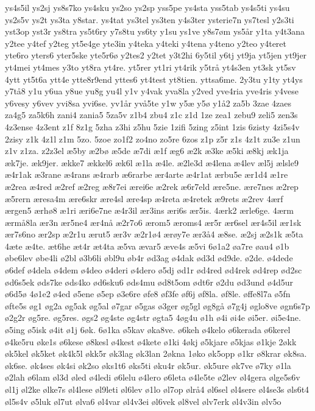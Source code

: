{ys4s5il
ys2sj
ys8s7ko
ys4sku
ys2so
ys2sp
yss5pe
ys4sta
yss5tab
ys4s5ti
ys4su
ys2s5v
ys2t
ys3ta
y8star.
ys4tat
ys3tel
ys3ten
y4s3ter
ysterie7n
ys7tesl
y2s3ti
yst3op
yst3r
ys8tra
ys5t6ry
y7s8tu
ys6ty
y1su
ys1ve
y8s7øm
ys5år
y1ta
y4t3ana
y2tee
y4tef
y2teg
yt5e4ge
yte3in
y4teka
y4teki
y4tena
y4teno
y2teo
y4teret
yte6ro
yters6
yter5ske
yte5r6ø
y2tes2
y2tet
y3t2hi
6y5til
y6tj
yt9ja
yt5jen
yt9jer
yt4mei
yt4mes
y3to
yt8ra
yt4re.
yt5rer
yt1ri
yt4rik
y5trå
yt4s3en
yt3sk
yt5sv
4ytt
yt5t6a
ytt4e
ytte8r9end
yttes6
yt4test
yt8tien.
yttsa6me.
2y3tu
y1ty
yt4ys
y7tå8
y1u
y6ua
y8ue
yu8g
yu4l
y1v
y4vak
yva8la
y2ved
yve4ria
yve4ris
y4vese
y6vesy
y6vev
yvi8sa
yvi6se.
yv1år
yvå5te
y1w
y5æ
y5ø
y1å2
za5b
3zae
4zaes
za4g5
za5k6h
zani4
zania5
5za5v
z1b4
zbu4
z1c
z1d
1ze
zea1
zebu9
zeli5
zen3s
4z3ense
4z3ent
z1f
8z1g
5zha
z3hi
z5hu
5zie
1zifi
5zing
z5int
1zis
6zisty
4zi5s4v
2zisy
z1k
4z1l
z1m
5zo.
5zoe
zo1f2
zo4no
zo5re
6zos
z1p
z5r
z1s
4z1t
zu3e
z1un
z1v
z1za.
z2z3el
æ5by
æ2bø
æ5de
æ7di
æ1f
æg6
æ2k
æ3ke
æ5ki
æ8kj
æk1ja
æk7je.
æk9jer.
ække7
ækkel6
æk6l
æ1la
æ4le.
æ2le3d
æ4lena
æ4lev
æl5j
ælsle9
æ4r1ak
æ3rane
æ4rans
æ4rarb
æ6rarbe
ær4arte
æ4r1at
ærbu5e
ær1d4
æ1re
æ2rea
æ4red
æ2ref
æ2reg
æ8r7ei
ærei6e
æ2rek
æ6r7eld
ære5ne.
ære7nes
æ2rep
æ5rern
æresa4m
ære6skr
ære4sl
ære4sp
æ4reta
æ4retek
æ9rets
æ2rev
4ærf
ærgen5
ærhø8
æ1ri
æri6e7ne
æ4r3il
ær3ins
æri6s
ær5is.
4ærk2
ærle6ge.
4ærm
ærmå8la
ær3n
ær5ne4
ær4nå
æ2r7o6
ærom5
æroms4
ær5r
ær6sel
ær4s5il
ær1sk
ær7s6no
ær2sp
æ2r1u
ærut5
ær3v
æ2r1ø4
ærøy7e
ær3å4
æ8se.
æ2sj
æ2s1k
æ5ta
4æte
æ4te.
æt6he
æt4r
æt4ta
æ5va
ævar5
æve4s
æ5vi
6ø1a2
øa7re
øau4
ø1b
øbe6lev
øbe4li
ø2bl
ø3b6li
øbl9u
øb4r
ød3ag
ø4dak
ød3d
ød9de.
ø2de.
ø4dede
ø6def
ø4dela
ø4dem
ø4deo
ø4deri
ø4dero
ø5dj
ød1r
ød4red
ød4rek
ød4rep
ød2sc
ød6s5ek
øds7ke
øds4ko
ød6sku6
øds4mu
ød8t5om
ødt6r
ø2du
ød3und
ø4d5ur
ø6d5ø
4ø1e2
ø4ed
ø5ene
ø5ep
ø3e6re
øfe8
øf3fe
øf6j
øf8la.
øf8le.
øffe8l7a
ø5fn
øfte5s
øg1
øg2a
øg5ak
øg5al
ø7gar
ø5gas
ø3ger
øg5gl
øg8gå
ø7g4j
øglo8ve
øgn6s7p
ø2g2r
øg5re.
øg5res.
øgs2
øg4ste
øg4str
øgta5
4øg4u
ø1h
ø4i
øi4e
øi5er.
øi5e4ne.
ø5ing
ø5isk
ø4it
ø1j
6øk.
6ø1ka
ø5kav
øka8ve.
ø6keh
ø4kelo
ø6kerada
ø6kerel
ø4ke5ru
øke1s
ø6kese
ø8kesl
ø4kest
ø4kete
ø1ki
4økj
ø5kjare
ø5kjas
ø1kje
2økk
øk5kel
øk5ket
øk4k5l
økk5r
øk3lag
øk3lan
2økna
1øko
øk5opp
ø1kr
ø8krar
øk8sa.
øk6se.
øk4ses
øk4si
øk2so
øks1t6
øks5ti
øku4r
øk5ur.
øk5ure
øk7ve
ø7ky
ø1la
ø2lah
ø6lam
øl3d
øled
ø4ledi
ø6lelu
ø4lero
ø6leta
ø4le5te
ø2lev
øl4gera
ølge5s6v
øl1j
øl2ke
ølke7s
øl4lese
øl9leti
øl6lev
ø1lo
øl7op
ølrå4
øl6sel
øl4sere
øl4se3s
øls6t4
øl5s4v
ø5luk
øl7ut
ølva6
øl4var
øl4v3ei
øl6vek
øl8vel
ølv7erk
øl4v3in
ølv5o
}
